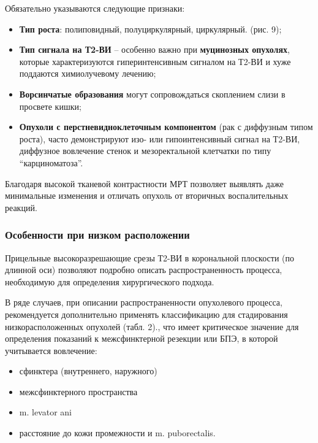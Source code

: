 \documentclass[
  russian,
  12pt,
  a4paper,
]{report}
\begin{document}
Обязательно указываются следующие признаки:

\begin{itemize}
\item
  \textbf{Тип роста}: полиповидный, полуциркулярный, циркулярный. (рис.
  9);
\item
  \textbf{Тип сигнала на Т2-ВИ} -- особенно важно при \textbf{муцинозных
  опухолях}, которые характеризуются гиперинтенсивным сигналом на Т2-ВИ
  и хуже поддаются химиолучевому лечению;
\item
  \textbf{Ворсинчатые образования} могут сопровождаться скоплением слизи
  в просвете кишки;
\item
  \textbf{Опухоли с перстневидноклеточным компонентом} (рак с диффузным
  типом роста), часто демонстрируют изо- или гипоинтенсивный сигнал на
  Т2-ВИ, диффузное вовлечение стенок и мезоректальной клетчатки по типу
  ``карциноматоза''.
\end{itemize}

Благодаря высокой тканевой контрастности МРТ позволяет выявлять даже
минимальные изменения и отличать опухоль от вторичных воспалительных
реакций.

\subsubsection{Особенности при низком
расположении}\label{ux43eux441ux43eux431ux435ux43dux43dux43eux441ux442ux438-ux43fux440ux438-ux43dux438ux437ux43aux43eux43c-ux440ux430ux441ux43fux43eux43bux43eux436ux435ux43dux438ux438}

Прицельные высокоразрешающие срезы Т2-ВИ в корональной плоскости (по
длинной оси) позволяют подробно описать распространенность процесса,
необходимую для определения хирургического подхода.

В ряде случаев, при описании распространенности опухолевого процесса,
рекомендуется дополнительно применять классификацию для стадирования
низкорасположенных опухолей (табл. 2)., что имеет критическое значение
для определения показаний к межсфинктерной резекции или БПЭ, в которой
учитывается вовлечение:

\begin{itemize}
\item
  сфинктера (внутреннего, наружного)
\item
  межсфинктерного пространства
\item
  m. levator ani
\item
  расстояние до кожи промежности и m. puborectalis.
\end{itemize}
\end{document}

